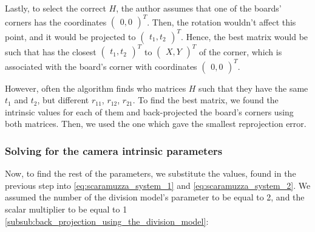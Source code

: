 Lastly, to select the correct \(H\), the author assumes that one of the boards'
corners has the coordinates \( \begin{pmatrix}
	0, 0
\end{pmatrix}^{T}\). Then, the rotation wouldn't affect this
point, and it would be projected to   \(\begin{pmatrix}
	t_1, t_2
\end{pmatrix}^{T}\). Hence, the best matrix would be such that has the closest
\(\begin{pmatrix}
	t_1, t_2
\end{pmatrix}^{T}\) to \(\begin{pmatrix}
	X, Y
\end{pmatrix}^{T}\) of the corner, which is associated with the board's corner
with coordinates \(\begin{pmatrix}
	0, 0
\end{pmatrix}^{T}\).

However, often the algorithm finds who matrices \(H\) such that they have the
same \(t_1\) and \(t_2 \), but different \(r_{11}\), \(r_{12}\), \(r_{21}\). To
find the best matrix, we found the intrinsic values for each of them and
back-projected the board's corners using both matrices.
Then, we used the one which gave the smallest reprojection error.

\subsubsection{Solving for the camera intrinsic parameters}\label{subsub:solving_for_the_camera_intrinsic_parameters}

Now, to find the rest of the parameters, we substitute the values, found in the
previous step into \cref{eq:scaramuzza_system_1} and
\cref{eq:scaramuzza_system_2}. We assumed the number of the division model's
parameter to be equal to 2, and the scalar multiplier to be equal to 1
\cref{subsub:back_projection_using_the_division_model}:

